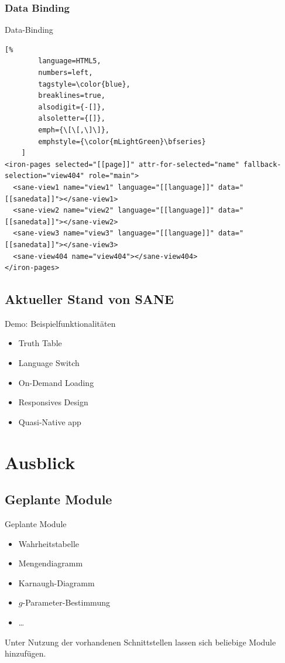 \documentclass{beamer}
\begin{document}
\subsubsection{Data Binding}
\begin{frame}[fragile]{Data-Binding}
	\begin{lstlisting}[%
		language=HTML5,
		numbers=left,
		tagstyle=\color{blue},
		breaklines=true,
		alsodigit={-[]},
		alsoletter={[]},
		emph={\[\[,\]\]},
		emphstyle={\color{mLightGreen}\bfseries}
	]
<iron-pages selected="[[page]]" attr-for-selected="name" fallback-selection="view404" role="main">
  <sane-view1 name="view1" language="[[language]]" data="[[sanedata]]"></sane-view1>
  <sane-view2 name="view2" language="[[language]]" data="[[sanedata]]"></sane-view2>
  <sane-view3 name="view3" language="[[language]]" data="[[sanedata]]"></sane-view3>
  <sane-view404 name="view404"></sane-view404>
</iron-pages>
	\end{lstlisting}
\end{frame}

\subsection{Aktueller Stand von \ac{SANE}}
\begin{frame}{Demo: Beispielfunktionalitäten}
	\begin{itemize}
		\item Truth Table
		\item Language Switch
		\item On-Demand Loading
		\item Responsives Design
		\item Quasi-Native app
	\end{itemize}
\end{frame}


\section{Ausblick}
\subsection{Geplante Module}
\begin{frame}{Geplante Module}
	\begin{itemize}
		\item Wahrheitstabelle
		\item Mengendiagramm
		\item Karnaugh-Diagramm
		\item  $g$-Parameter-Bestimmung
		\item …
	\end{itemize}
	Unter Nutzung der vorhandenen Schnittstellen lassen sich beliebige Module hinzufügen.
\end{frame}
\end{document}
